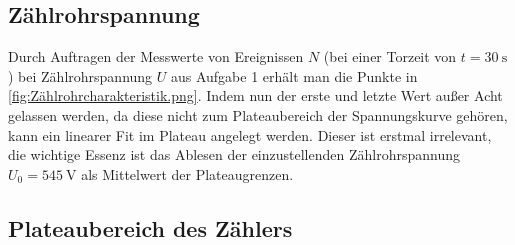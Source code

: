 
\subsection{Zählrohrspannung}
Durch Auftragen der Messwerte von Ereignissen \(N\) (bei einer Torzeit von \(t=\qty{30}{\second}\)) bei Zählrohrspannung \(U\) aus Aufgabe 1 erhält man die Punkte in \cref{fig:Zählrohrcharakteristik.png}. Indem nun der erste und letzte Wert außer Acht gelassen werden, da diese nicht zum Plateaubereich der Spannungskurve gehören, kann ein linearer Fit im Plateau angelegt werden. Dieser ist erstmal irrelevant, die wichtige Essenz ist das Ablesen der einzustellenden Zählrohrspannung \(U_0=\qty{545}{\volt}\) als Mittelwert der Plateaugrenzen.


\subsection{Plateaubereich des Zählers}
